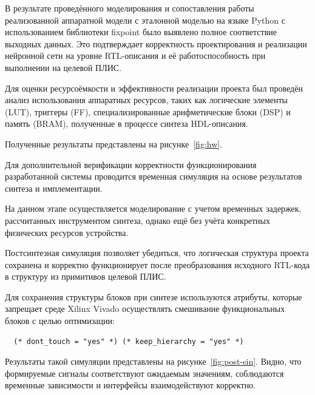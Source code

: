 
В результате проведённого моделирования и сопоставления работы реализованной 
аппаратной модели с эталонной моделью на языке Python с использованием
библиотеки fixpoint было выявлено полное соответствие выходных данных. Это 
подтверждает корректность проектирования и реализации нейронной сети на 
уровне RTL-описания и её работоспособность при выполнении на целевой ПЛИС.

Для оценки ресурсоёмкости и эффективности реализации проекта был проведён 
анализ использования аппаратных ресурсов, таких как логические элементы 
(LUT), триггеры (FF), специализированные арифметические блоки (DSP) и память 
(BRAM), полученные в процессе синтеза HDL-описания. 

Полученные результаты представлены на рисунке~\ref{fig:hw}.


Для дополнительной верификации корректности функционирования разработанной 
системы проводится временная симуляция на основе результатов синтеза и 
имплементации.

На данном этапе осуществляется моделирование с учетом временных задержек, 
рассчитанных инструментом синтеза, однако ещё без учёта конкретных физических 
ресурсов устройства. 

Постсинтезная симуляция позволяет убедиться, что 
логическая структура проекта сохранена и корректно функционирует после 
преобразования исходного RTL-кода в структуру из примитивов целевой ПЛИС.

Для сохранения структуры блоков при синтезе используются атрибуты, которые 
запрещает среде Xilinx Vivado осуществлять смешивание функциональных блоков
с целью оптимизации:

\small
\fontsize{12pt}{12pt}\selectfont
\begin{verbatim}
  (* dont_touch = "yes" *) (* keep_hierarchy = "yes" *) 
\end{verbatim}
\normalsize
\fontsize{14pt}{14pt}\selectfont

Результаты такой симуляции представлены на рисунке~\ref{fig:post-sin}. Видно, 
что формируемые сигналы соответствуют ожидаемым значениям, соблюдаются 
временные зависимости и интерфейсы взаимодействуют корректно.

